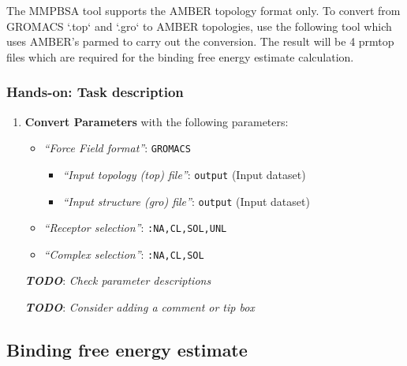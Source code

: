 \documentclass[twocolumn]{bmcart}%
\providecommand{\tightlist}{%
  \setlength{\itemsep}{0pt}\setlength{\parskip}{0pt}}
\providecommand{\tightlist}{%
  \setlength{\itemsep}{0pt}\setlength{\parskip}{0pt}}
\begin{document}
The MMPBSA tool supports the AMBER topology format only. To convert from GROMACS
`.top` and `.gro` to AMBER topologies, use the following tool which uses
AMBER's parmed to carry out the conversion. The result will be 4 prmtop
files which are required for the binding free energy estimate
calculation.


\begin{handson_box_colour}


\hypertarget{hands-on-task-description-17}{%
\subsubsection{Hands-on: Task
description}\label{hands-on-task-description-17}}

\begin{enumerate}
\def\labelenumi{\arabic{enumi}.}
\tightlist
\item
  \textbf{Convert Parameters} with the following parameters:

  \begin{itemize}
  \tightlist
  \item
    \emph{``Force Field format''}: \texttt{GROMACS}

    \begin{itemize}
    \tightlist
    \item
      \emph{``Input topology (top) file''}: \texttt{output} (Input
      dataset)
    \item
      \emph{``Input structure (gro) file''}: \texttt{output} (Input
      dataset)
    \end{itemize}
  \item
    \emph{``Receptor selection''}: \texttt{:NA,CL,SOL,UNL}
  \item
    \emph{``Complex selection''}: \texttt{:NA,CL,SOL}
  \end{itemize}

  \textbf{\emph{TODO}}: \emph{Check parameter descriptions}

  \textbf{\emph{TODO}}: \emph{Consider adding a comment or tip box}
\end{enumerate}
\end{handson_box_colour}

\hypertarget{binding-free-energy-estimate}{%
\subsection{Binding free energy
estimate}\label{binding-free-energy-estimate}}
\end{document}
